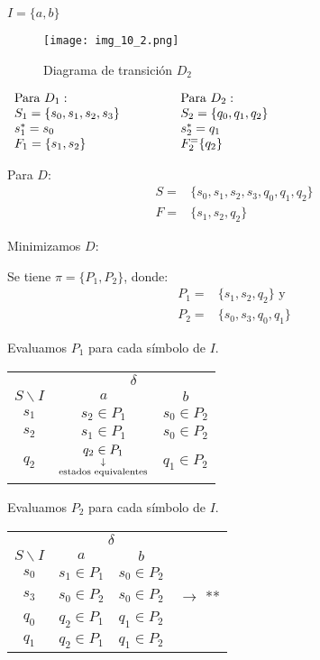 $I=\{a,b\}$
\begin{figure}[h!]
\centering
\texttt{[image: img\_10\_2.png]}
\caption{Diagrama de transición $D_2$}\label{img_10_2}
\end{figure}

\begin{center}
$\begin{array}{lp{1cm}l}
\mbox{Para }D_1:&			&\mbox{Para }D_2:	\\
S_1=\{s_0,s_1,s_2,s_3\}&		&S_2=\{q_0,q_1,q_2\}\\
s_1^*=s_0&					&s_2^*=q_1	\\
F_1=\{ s_1,s_2\}&			&F_2^=\{q_2\}
\end{array}$
\end{center}

Para $D$: 
\begin{align*}
S=&\{s_0,s_1,s_2,s_3,q_0,q_1,q_2\}\\
F=&\{s_1,s_2,q_2\}
\end{align*}

Minimizamos $D$:

Se tiene $\pi =\{P_1,P_2\}$, donde:
\begin{align*}
P_1=&\{s_1,s_2,q_2\}\mbox{	y}\\
P_2=&\{s_0,s_3,q_0,q_1\}
\end{align*}

Evaluamos $P_1$ para cada símbolo de $I$.

\begin{center}
\begin{tabular}{c|cc}
		&\multicolumn{2}{c}{$\delta$}	\\
$S\backslash I$	&$a	$			&$b$			\\ \hline
$s_1$	&$s_2\in P_1$	&$s_0\in P_2$	\\
$s_2$	&$s_1\in P_1$	&$s_0\in P_2$	\\
$q_2$	&$\downlegend{q_2\in P_1}{estados  equivalentes}$	&$q_1\in P_2$
\end{tabular}
\end{center}

Evaluamos $P_2$ para cada símbolo de $I$.

\begin{center}
\begin{tabular}{c|ccl}
		&\multicolumn{2}{c}{$\delta$}	\\
$S\backslash I$	&$a$	&$b$	&\\ \hline
$s_0$	&$s_1\in P_1$	&$s_0\in P_2$ &	\\
$s_3$	&$s_0\in P_2$	&$s_0\in P_2$ &$\rightarrow$ **	\\
$q_0$	&$q_2\in P_1$	&$q_1\in P_2$ &	\\
$q_1$	&$q_2\in P_1$	&$q_1 \in P_2$ &

\end{tabular}
\end{center}

